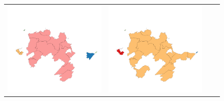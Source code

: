 \begin{figure}[p]
\begin{tabularx}{1\textwidth}{XXXX}
\includegraphics[width=1\linewidth]{images/ch6/contig/11}&
\includegraphics[width=1\linewidth]{images/ch6/contig/12} \\

\end{tabularx}
\end{figure}
